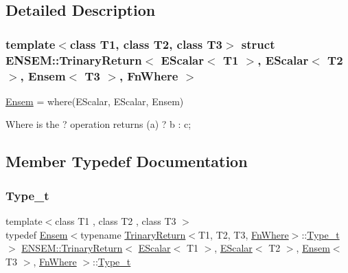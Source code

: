 \subsection{Detailed Description}
\subsubsection*{template$<$class T1, class T2, class T3$>$\newline
struct E\+N\+S\+E\+M\+::\+Trinary\+Return$<$ E\+Scalar$<$ T1 $>$, E\+Scalar$<$ T2 $>$, Ensem$<$ T3 $>$, Fn\+Where $>$}

\mbox{\hyperlink{classENSEM_1_1Ensem}{Ensem}} = where(\+E\+Scalar, E\+Scalar, Ensem) 

Where is the ? operation returns (a) ? b \+: c; 

\subsection{Member Typedef Documentation}
\mbox{\label{structENSEM_1_1TrinaryReturn_3_01EScalar_3_01T1_01_4_00_01EScalar_3_01T2_01_4_00_01Ensem_3_01T3_01_4_00_01FnWhere_01_4_ad84eb99fb099d2facf6b12f6d8cc510d}} 
\subsubsection{\texorpdfstring{Type\_t}{Type\_t}\hspace{0.1cm}{\footnotesize\ttfamily [1/2]}}
{\footnotesize\ttfamily template$<$class T1 , class T2 , class T3 $>$ \\
typedef \mbox{\hyperlink{classENSEM_1_1Ensem}{Ensem}}$<$typename \mbox{\hyperlink{structENSEM_1_1TrinaryReturn}{Trinary\+Return}}$<$T1, T2, T3, \mbox{\hyperlink{structENSEM_1_1FnWhere}{Fn\+Where}}$>$\+::\mbox{\hyperlink{structENSEM_1_1TrinaryReturn_3_01EScalar_3_01T1_01_4_00_01EScalar_3_01T2_01_4_00_01Ensem_3_01T3_01_4_00_01FnWhere_01_4_ad84eb99fb099d2facf6b12f6d8cc510d}{Type\+\_\+t}}$>$ \mbox{\hyperlink{structENSEM_1_1TrinaryReturn}{E\+N\+S\+E\+M\+::\+Trinary\+Return}}$<$ \mbox{\hyperlink{classENSEM_1_1EScalar}{E\+Scalar}}$<$ T1 $>$, \mbox{\hyperlink{classENSEM_1_1EScalar}{E\+Scalar}}$<$ T2 $>$, \mbox{\hyperlink{classENSEM_1_1Ensem}{Ensem}}$<$ T3 $>$, \mbox{\hyperlink{structENSEM_1_1FnWhere}{Fn\+Where}} $>$\+::\mbox{\hyperlink{structENSEM_1_1TrinaryReturn_3_01EScalar_3_01T1_01_4_00_01EScalar_3_01T2_01_4_00_01Ensem_3_01T3_01_4_00_01FnWhere_01_4_ad84eb99fb099d2facf6b12f6d8cc510d}{Type\+\_\+t}}}

